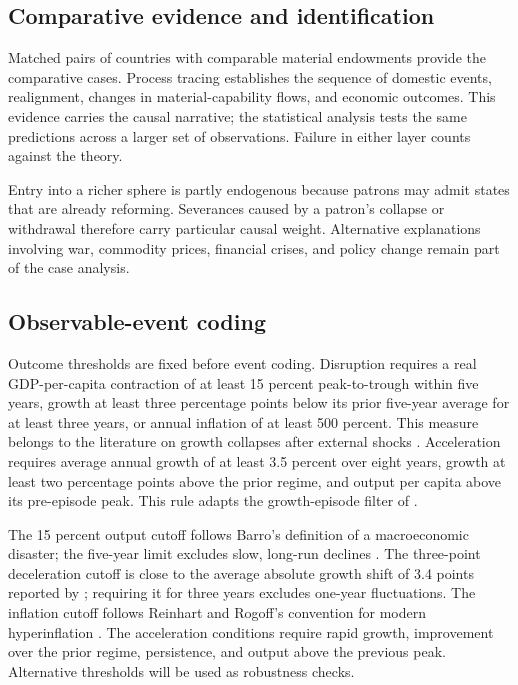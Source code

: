 \documentclass[11pt]{article}
\begin{document}
\subsection{Comparative evidence and identification}

Matched pairs of countries with comparable material endowments provide the comparative cases. Process tracing establishes the sequence of domestic events, realignment, changes in material-capability flows, and economic outcomes. This evidence carries the causal narrative; the statistical analysis tests the same predictions across a larger set of observations. Failure in either layer counts against the theory.

Entry into a richer sphere is partly endogenous because patrons may admit states that are already reforming. Severances caused by a patron's collapse or withdrawal therefore carry particular causal weight. Alternative explanations involving war, commodity prices, financial crises, and policy change remain part of the case analysis.

\subsection{Observable-event coding}

Outcome thresholds are fixed before event coding. Disruption requires a real GDP-per-capita contraction of at least 15 percent peak-to-trough within five years, growth at least three percentage points below its prior five-year average for at least three years, or annual inflation of at least 500 percent. This measure belongs to the literature on growth collapses after external shocks \parencite{rodrik_1999}. Acceleration requires average annual growth of at least 3.5 percent over eight years, growth at least two percentage points above the prior regime, and output per capita above its pre-episode peak. This rule adapts the growth-episode filter of \textcite{hausmann_pritchett_rodrik_2005}.

The 15 percent output cutoff follows Barro's definition of a macroeconomic disaster; the five-year limit excludes slow, long-run declines \parencite{barro_2006}. The three-point deceleration cutoff is close to the average absolute growth shift of 3.4 points reported by \textcite{pritchett_2000}; requiring it for three years excludes one-year fluctuations. The inflation cutoff follows Reinhart and Rogoff's convention for modern hyperinflation \parencite{reinhart_rogoff_2011}. The acceleration conditions require rapid growth, improvement over the prior regime, persistence, and output above the previous peak. Alternative thresholds will be used as robustness checks.
\end{document}
